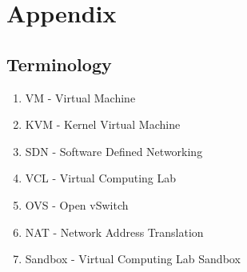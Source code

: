 \documentclass{article}
\begin{document}
\section{Appendix}
\subsection{Terminology}
\begin{enumerate}
    \item VM - Virtual Machine
    \item KVM - Kernel Virtual Machine
    \item SDN - Software Defined Networking
    \item VCL - Virtual Computing Lab
    \item OVS - Open vSwitch
    \item NAT - Network Address Translation
    \item Sandbox - Virtual Computing Lab Sandbox
\end{enumerate}



\end{document}
